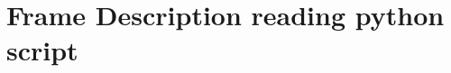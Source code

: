 \documentclass[a4paper]{article}
\begin{document}
\newpage

\appendix

\section{Frame Description reading python script}
\label{codeDescription}


%










\end{document}

